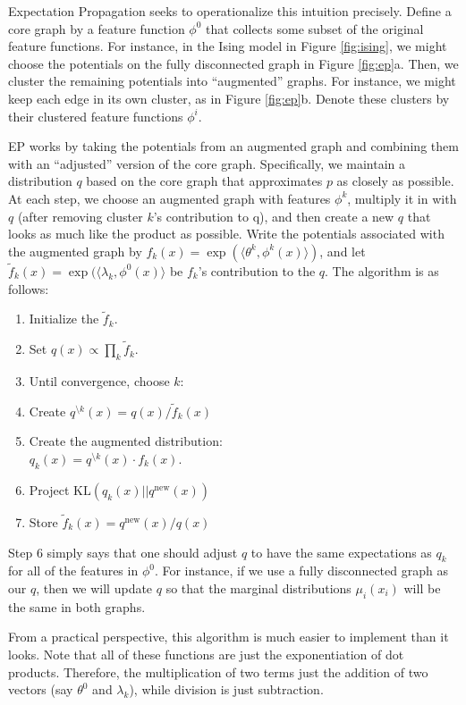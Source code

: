 \documentclass[times, 10pt,twocolumn]{article}
\newcommand{\bs}[0]{\textrm{\textbackslash}}
\begin{document}
Expectation Propagation\cite{Minka01} seeks to operationalize this
intuition precisely. Define a core graph by a feature function
$\phi^0$ that collects some subset of the original feature
functions. For instance, in the Ising model in Figure
\ref{fig:ising}, we might choose the potentials on the fully
disconnected graph in Figure \ref{fig:ep}a. Then, we cluster the
remaining potentials into ``augmented'' graphs. For instance, we
might keep each edge in its own cluster, as in Figure
\ref{fig:ep}b. Denote these clusters by their clustered feature
functions $\phi^i$.

EP works by taking the potentials from an augmented graph and
combining them with an ``adjusted'' version of the core graph.
Specifically, we maintain a distribution $q$ based on the core graph
that approximates $p$ as closely as possible. At each step, we
choose an augmented graph with features $\phi^k$, multiply it in
with $q$ (after removing cluster $k$'s contribution to q), and then
create a new $q$ that looks as much like the product as possible.
Write the potentials associated with the augmented graph by $f_k(x)
= \exp( \langle \theta^k, \phi^k(x) \rangle )$, and let
$\tilde f_k(x) = \exp( \langle \lambda_k, \phi^0(x)\rangle$ be
$f_k$'s contribution to the $q$. The algorithm is as follows:
\begin{enumerate}
  \item Initialize the $\tilde f_k$.
  \item Set $q(x) \propto \prod_k \tilde f_k$.
  \item Until convergence, choose $k$:
  \item Create $q^{\bs k}(x) = q(x) / \tilde f_k(x)$
  \item Create the augmented distribution:\\
    $q_k(x) = q^{\bs
    k}(x)\cdot f_k(x)$.
  \item Project $\mathrm{KL}(q_k(x) || q^{\textrm{new}}(x))$
  \item Store $\tilde f_k(x) = q^{\textrm{new}}(x)/q(x)$
\end{enumerate}
Step 6 simply says that one should adjust $q$ to have the same
expectations as $q_k$ for all of the features in $\phi^0$. For
instance, if we use a fully disconnected graph as our $q$, then we
will update $q$ so that the marginal distributions $\mu_i(x_i)$
will be the same in both graphs.

From a practical perspective, this algorithm is much easier to
implement than it looks. Note that all of these functions are just
the exponentiation of dot products. Therefore, the multiplication
of two terms just the addition of two vectors (say $\theta^0$ and
$\lambda_k$), while division is just subtraction. 
\end{document}
